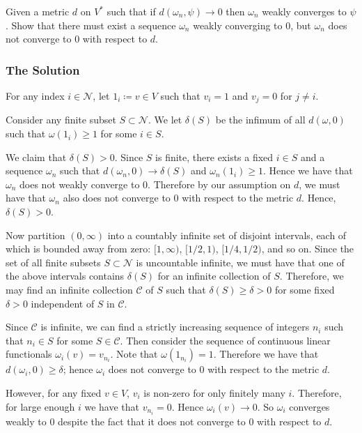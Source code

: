 Given a metric \(d\) on \(V^*\) such that if \(d(\omega_n, \psi) \to 0\) then \(\omega_n\) weakly converges
to \(\psi\). Show that there must exist a sequence \(\omega_n\) weakly converging to \(0\), but \(\omega_n\)
does not converge to \(0\) with respect to \(d\). 

\subsubsection*{The Solution}

For any index \(i \in \mathcal N\), let \(1_i \coloneq v \in V\) such that \(v_i = 1\) and \(v_j = 0\) for
\(j \neq i\).

Consider any finite subset \(S \subset \mathcal N\). We let \(\delta(S)\) be the infimum of all
\(d(\omega, 0)\) such that \(\omega(1_i) \geq 1\) for some \(i \in S\).

We claim that \(\delta(S) > 0\). Since \(S\) is finite, there exists a fixed \(i \in S\) and a sequence \(\omega_n\)
such that \(d(\omega_n, 0) \to \delta(S)\) and \(\omega_n(1_i) \geq 1\). Hence we have that \(\omega_n\) does
not weakly converge to \(0\). Therefore by our assumption on \(d\), we must have that \(\omega_n\) also does
not converge to \(0\) with respect to the metric \(d\). Hence, \(\delta(S) > 0\). 

Now partition \((0, \infty)\) into a countably infinite set of disjoint intervals,
each of which is bounded away from
zero: \([1, \infty)\), \([1/2, 1)\), \([1/4, 1/2)\), and so on. Since the set of all finite subsets
\(S \subset \mathcal N\) is uncountable infinite, we must have that one of the above intervals contains
\(\delta(S)\) for an infinite collection of \(S\). Therefore, we may find an infinite collection \(\mathcal C\)
of \(S\)
such that \(\delta(S) \geq \delta > 0\) for some fixed \(\delta > 0\) independent of \(S\) in \(\mathcal C\).

Since \(\mathcal C\) is infinite, we can find a strictly increasing sequence of integers \(n_i\) such that
\(n_i \in S\) for some \(S \in \mathcal C\). Then consider the sequence of continuous linear
functionals \(\omega_i(v) = v_{n_i}\). Note that \(\omega(1_{n_i}) = 1\). Therefore we have that
\(d(\omega_i, 0) \geq \delta\); hence \(\omega_i\) does not converge to \(0\) with respect to the metric \(d\).

However, for any fixed \(v \in V\), \(v_i\) is non-zero for only finitely many \(i\). Therefore, for
large enough \(i\) we have that \(v_{n_i} = 0\). Hence \(\omega_i(v) \to 0\). So \(\omega_i\) converges
weakly to \(0\) despite the fact that it does not converge to \(0\) with respect to \(d\). 
